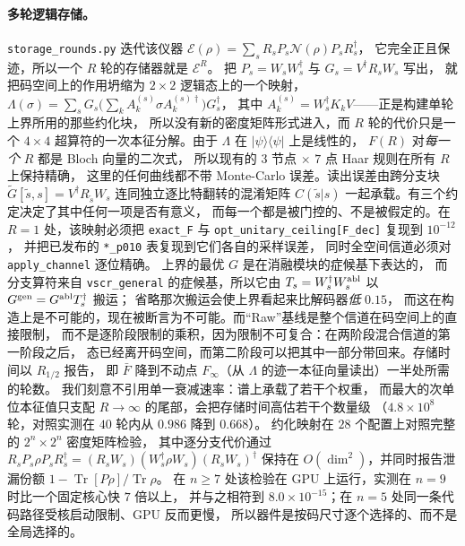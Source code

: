 \documentclass[11pt,a4paper]{article}
\newcommand{\ket}[1]{\lvert #1\rangle}
\newcommand{\bra}[1]{\langle #1\rvert}
\begin{document}
\paragraph{多轮逻辑存储。}
\texttt{storage\_rounds.py} 迭代该仪器
$\mathcal{E}(\rho)=\sum_sR_sP_s\mathcal{N}(\rho)P_sR_s^\dagger$，
它完全正且保迹，所以一个 $R$ 轮的存储器就是 $\mathcal{E}^R$。
把 $P_s=W_sW_s^\dagger$ 与 $G_s=V^\dagger R_sW_s$ 写出，
就把码空间上的作用坍缩为 $2\times2$ 逻辑态上的一个映射，
$\Lambda(\sigma)=\sum_sG_s\big(\sum_kA_k^{(s)}\sigma A_k^{(s)\dagger}\big)G_s^\dagger$，
其中 $A_k^{(s)}=W_s^\dagger K_kV$——正是构建单轮上界所用的那些约化块，
所以没有新的密度矩阵形式进入，而 $R$ 轮的代价只是一个 $4\times4$
超算符的一次本征分解。由于 $\Lambda$ 在 $\ket\psi\bra\psi$ 上是线性的，
$F(R)$ 对\emph{每一个} $R$ 都是 Bloch 向量的二次式，
所以现有的 $3$ 节点 $\times$ $7$ 点 Haar 规则在所有 $R$ 上保持精确，
这里的任何曲线都不带 Monte-Carlo 误差。读出误差由跨分支块
$\tilde G[\tilde s,s]=V^\dagger R_{\tilde s}W_s$ 连同独立逐比特翻转的混淆矩阵
$C(\tilde s|s)$ 一起承载。有三个约定决定了其中任何一项是否有意义，
而每一个都是被门控的、不是被假定的。在 $R=1$ 处，该映射必须把
\texttt{exact\_F} 与 \texttt{opt\_unitary\_ceiling[F\_dec]} 复现到 $10^{-12}$，
并把已发布的 \texttt{*\_p010} 表复现到它们各自的采样误差，
同时全空间信道必须对 \texttt{apply\_channel} 逐位精确。
上界的最优 $G$ 是在消融模块的症候基下表达的，
而分支算符来自 \texttt{vscr\_general} 的症候基，所以它由
$T_s=W_s^\dagger W^{\rm abl}_s$ 以 $G^{\rm gen}=G^{\rm abl}T_s^\dagger$ 搬运；
省略那次搬运会使上界看起来比解码器\emph{低} $0.15$，
而这在构造上是不可能的，现在被断言为不可能。而“Raw”基线是整个信道在码空间上的直接限制，
而不是逐阶段限制的乘积，因为限制不可复合：在两阶段混合信道的第一阶段之后，
态已经离开码空间，而第二阶段可以把其中一部分带回来。存储时间以 $R_{1/2}$ 报告，
即 $\bar F$ 降到不动点 $F_\infty$（从 $\Lambda$ 的迹一本征向量读出）一半处所需的轮数。
我们刻意不引用单一衰减速率：谱上承载了若干个权重，
而最大的次单位本征值只支配 $R\to\infty$ 的尾部，会把存储时间高估若干个数量级
（$4.8\times10^{8}$ 轮，对照实测在 $40$ 轮内从 $0.986$ 降到 $0.668$）。
约化映射在 $28$ 个配置上对照完整的 $2^n\times2^n$ 密度矩阵检验，
其中逐分支代价通过
$R_sP_s\rho P_sR_s^\dagger=(R_sW_s)(W_s^\dagger\rho W_s)(R_sW_s)^\dagger$
保持在 $O(\dim^2)$，并同时报告泄漏份额
$1-\operatorname{Tr}[P\rho]/\operatorname{Tr}\rho$。
在 $n\ge7$ 处该检验在 GPU 上运行，实测在 $n=9$ 时比一个固定核心快 $7$ 倍以上，
并与之相符到 $8.0\times10^{-15}$；在 $n=5$ 处同一条代码路径受核启动限制、GPU 反而更慢，
所以器件是按码尺寸逐个选择的、而不是全局选择的。
\end{document}
